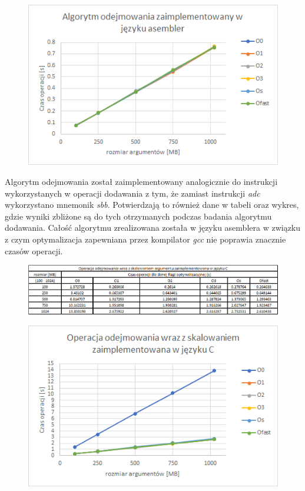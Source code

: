 \documentclass{article}
\begin{document}
\begin{figure}[h!]
\centering
\includegraphics[scale=0.75]{charts/sbb_asm_p.png}

\end{figure}

\vspace{5mm}

Algorytm odejmowania został zaimplementowany analogicznie do instrukcji wykorzystanych w operacji dodawania z tym, że zamiast instrukcji \textit{adc} wykorzystano mnemonik \textit{sbb}. Potwierdzają to również dane w tabeli oraz wykres, gdzie wyniki zbliżone są do tych otrzymanych podczas badania algorytmu dodawania. Całość algorytmu zrealizowana została w języku asemblera w związku z czym optymalizacja zapewniana przez kompilator \textit{gcc} nie poprawia znacznie czasów operacji.

\newpage{}

\begin{figure}[h!]

\includegraphics[scale=0.65]{charts/sbb_scale_c.png}

\end{figure}

\begin{figure}[h!]
\centering
\includegraphics[scale=0.75]{charts/sbb_scale_c_p.png}

\end{figure}
\end{document}
